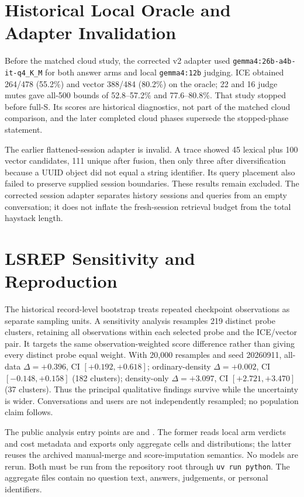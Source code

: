 \documentclass[11pt,a4paper]{article}
\begin{document}
\section{Historical Local Oracle and Adapter Invalidation}
\label{app:lme-history}
Before the matched cloud study, the corrected v2 adapter used \texttt{gemma4:26b-a4b-it-q4\_K\_M} for both answer arms and local \texttt{gemma4:12b} judging. ICE obtained 264/478 (55.2\%) and vector 388/484 (80.2\%) on the oracle; 22 and 16 judge mutes gave all-500 bounds of 52.8--57.2\% and 77.6--80.8\%. That study stopped before full-S. Its scores are historical diagnostics, not part of the matched cloud comparison, and the later completed cloud phases supersede the stopped-phase statement.

The earlier flattened-session adapter is invalid. A trace showed 45 lexical plus 100 vector candidates, 111 unique after fusion, then only three after diversification because a UUID object did not equal a string identifier. Its query placement also failed to preserve supplied session boundaries. These results remain excluded. The corrected session adapter separates history sessions and queries from an empty conversation; it does not inflate the fresh-session retrieval budget from the total haystack length.

\FloatBarrier
\section{LSREP Sensitivity and Reproduction}
\label{app:clustered}
The historical record-level bootstrap treats repeated checkpoint observations as separate sampling units. A sensitivity analysis resamples 219 distinct probe clusters, retaining all observations within each selected probe and the ICE/vector pair. It targets the same observation-weighted score difference rather than giving every distinct probe equal weight. With 20,000 resamples and seed 20260911, all-data $\Delta=+0.396$, CI $[+0.192,+0.618]$; ordinary-density $\Delta=+0.002$, CI $[-0.148,+0.158]$ (182 clusters); density-only $\Delta=+3.097$, CI $[+2.721,+3.470]$ (37 clusters). Thus the principal qualitative findings survive while the uncertainty is wider. Conversations and users are not independently resampled; no population claim follows.

The public analysis entry points are  and . The former reads local arm verdicts and cost metadata and exports only aggregate cells and distributions; the latter reuses the archived manual-merge and score-imputation semantics. No models are rerun. Both must be run from the repository root through \texttt{uv run python}. The aggregate files contain no question text, answers, judgements, or personal identifiers.
\end{document}

